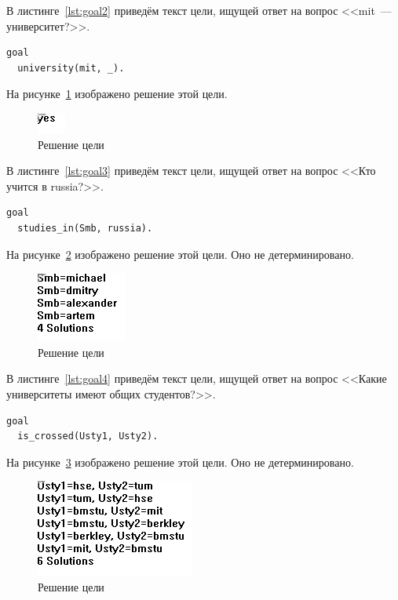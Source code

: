 В листинге~\ref{lst:goal2} приведём текст цели, ищущей ответ на вопрос <<mit~--- университет?>>.
\begin{lstlisting}[caption={Цель \textnumero2},label=lst:goal2]
goal
  university(mit, _).
\end{lstlisting}
На рисунке~\ref{img:goal2} изображено решение этой цели.
\begin{figure}[H]
    \includegraphics[scale=0.75]{imgs/goal2.png}
    \caption{Решение цели }\label{img:goal2}
\end{figure}

В листинге~\ref{lst:goal3} приведём текст цели, ищущей ответ на вопрос <<Кто учится в russia?>>.
\begin{lstlisting}[caption={Цель \textnumero3},label=lst:goal3]
goal
  studies_in(Smb, russia).
\end{lstlisting}
На рисунке~\ref{img:goal3} изображено решение этой цели. Оно не детерминировано.
\begin{figure}[H]
    \includegraphics[scale=0.75]{imgs/goal3.png}
    \caption{Решение цели }\label{img:goal3}
\end{figure}

В листинге~\ref{lst:goal4} приведём текст цели, ищущей ответ на вопрос <<Какие университеты имеют общих студентов?>>.
\begin{lstlisting}[caption={Цель \textnumero4},label=lst:goal4]
goal
  is_crossed(Usty1, Usty2).
\end{lstlisting}
На рисунке~\ref{img:goal4} изображено решение этой цели. Оно не детерминировано.
\begin{figure}[H]
    \includegraphics[scale=0.75]{imgs/goal4.png}
    \caption{Решение цели }\label{img:goal4}
\end{figure}

